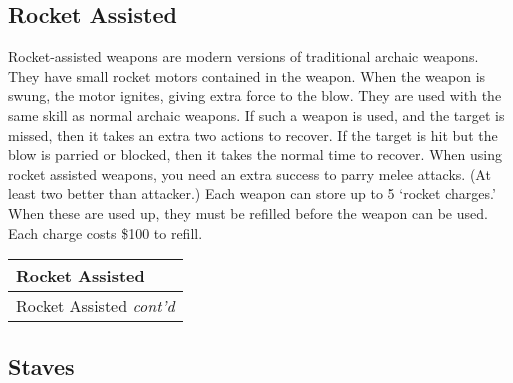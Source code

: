 \documentclass[twoside]{book}
\begin{document}
    

\subsection{Rocket Assisted}
      Rocket-assisted weapons are modern versions of
               traditional archaic weapons. They have small rocket motors
               contained in the weapon. When the weapon is swung, the
               motor ignites, giving extra force to the blow. They are
               used with the same skill as normal archaic weapons.
                 If such a weapon is used, and the target is missed,
               then it takes an extra two actions to recover. If the
               target is hit but the blow is parried or blocked, then it
               takes the normal time to recover.   When using rocket assisted weapons, you need an
               extra success to parry melee attacks. (At least two better
               than attacker.)   Each weapon can store up to 5 `rocket
               charges.' When these are used up, they must be
               refilled before the weapon can be used. Each charge costs
               \$100 to refill. 
\begin{longtable}{p{1.25in}} 
  Rocket Assisted
  \\
  \hline
  \hline
  \endfirsthead
  Rocket Assisted \textit{cont'd}
        
  \\
  \hline
  \endhead
      
\end{longtable}
    
\begin{multicols}{2}
\hspace{-1.75ex}
    
\end{multicols}
  
    

\subsection{Staves}
    
\end{document}
